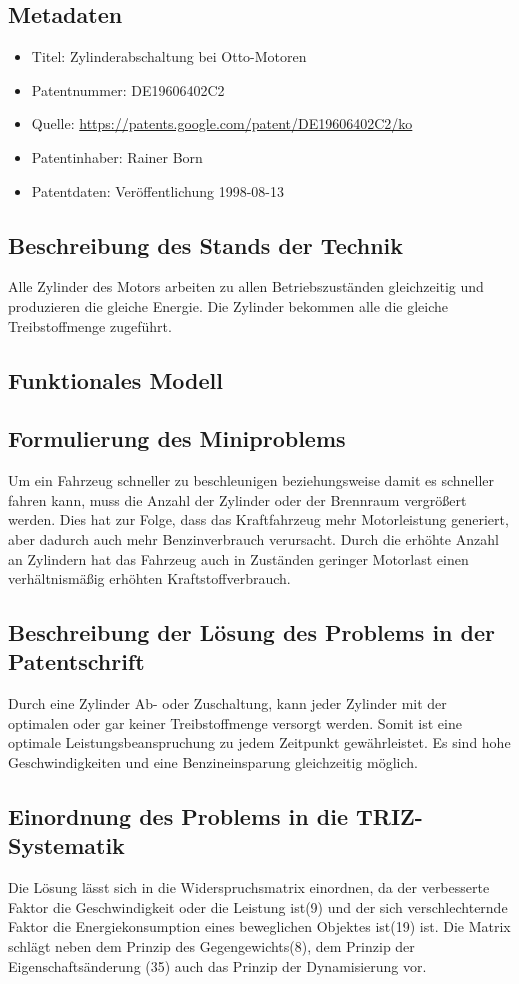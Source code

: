 \documentclass[11pt,a4paper]{article}
\begin{document}
\subsection{Metadaten}
\begin{itemize}\itemsep0pt
\item Titel: Zylinderabschaltung bei Otto-Motoren
\item Patentnummer: DE19606402C2
\item Quelle: \url{https://patents.google.com/patent/DE19606402C2/ko}
\item Patentinhaber:  Rainer Born 
\item Patentdaten: Veröffentlichung 1998-08-13

\end{itemize}
\subsection{Beschreibung des Stands der Technik}
Alle Zylinder des Motors arbeiten zu allen Betriebszuständen gleichzeitig und
produzieren die gleiche Energie. Die Zylinder bekommen alle die gleiche
Treibstoffmenge zugeführt.
\subsection{Funktionales Modell}

\subsection{Formulierung des Miniproblems}
Um ein Fahrzeug schneller zu beschleunigen beziehungsweise damit es schneller
fahren kann, muss die Anzahl der Zylinder oder der Brennraum vergrößert
werden. Dies hat zur Folge, dass das Kraftfahrzeug mehr Motorleistung
generiert, aber dadurch auch mehr Benzinverbrauch verursacht.  Durch die
erhöhte Anzahl an Zylindern hat das Fahrzeug auch in Zuständen geringer
Motorlast einen verhältnismäßig erhöhten Kraftstoffverbrauch.
\subsection{Beschreibung der Lösung des Problems in der Patentschrift}
Durch eine Zylinder Ab- oder Zuschaltung, kann jeder Zylinder mit der
optimalen oder gar keiner Treibstoffmenge versorgt werden.  Somit ist eine
optimale Leistungsbeanspruchung zu jedem Zeitpunkt gewährleistet.  Es sind
hohe Geschwindigkeiten und eine Benzineinsparung gleichzeitig möglich.

\subsection{Einordnung des Problems in die TRIZ-Systematik}
Die Lösung lässt sich in die Widerspruchsmatrix einordnen, da der verbesserte
Faktor die Geschwindigkeit oder die Leistung ist(9) und der sich
verschlechternde Faktor die Energiekonsumption eines beweglichen Objektes
ist(19) ist. Die Matrix schlägt neben dem Prinzip des Gegengewichts(8), dem
Prinzip der Eigenschaftsänderung (35) auch das Prinzip der Dynamisierung vor.
\end{document}
